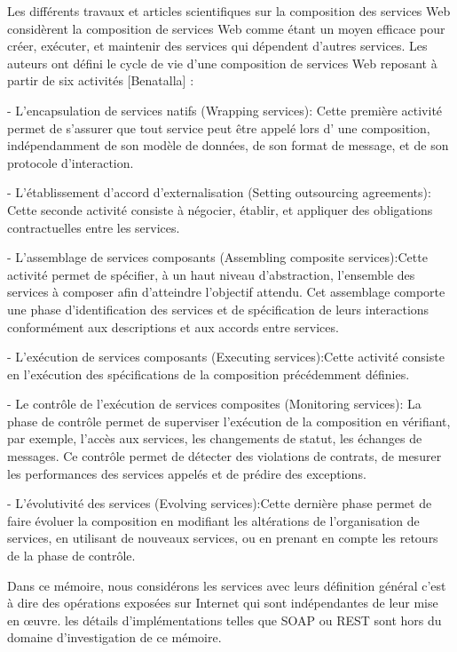 Les différents travaux et articles scientifiques sur la composition des services Web considèrent la composition de services Web comme étant un moyen efficace 
pour créer, exécuter, et maintenir des services qui dépendent d’autres services. Les auteurs ont défini le cycle de vie d’une composition de services Web reposant à partir de six activités [Benatalla] \cite{6}: 

- L’encapsulation de services natifs (Wrapping services): Cette première activité permet de  s’assurer que tout service peut être appelé lors d’ une composition, indépendamment de son  modèle de données, de son format de message, et de son protocole d’interaction. 


- L’établissement d’accord d’externalisation (Setting outsourcing agreements): Cette seconde activité consiste à négocier, établir, et appliquer des obligations contractuelles entre les services.


- L’assemblage de services composants (Assembling composite services):Cette activité permet  de spécifier, à un haut niveau d’abstraction, l’ensemble des services à composer afin d’atteindre  l’objectif attendu. Cet assemblage comporte une phase d’identification des services et de spécification de leurs interactions conformément aux descriptions et aux accords entre services. 


- L’exécution de services composants (Executing services):Cette activité consiste en l’exécution des spécifications de la composition précédemment définies. 


- Le contrôle de l’exécution de services composites (Monitoring services): La phase de contrôle permet de superviser l’exécution de la composition en vérifiant, par exemple, l’accès aux services, les changements de statut, les échanges de messages. Ce contrôle permet de détecter des violations de contrats, de mesurer les performances des services appelés et de prédire des exceptions. 


- L’évolutivité des services (Evolving services):Cette dernière phase permet de faire évoluer la composition en modifiant les altérations de l’organisation de services, en utilisant de nouveaux  services, ou en prenant en compte les retours de la phase de contrôle. \cite{6}



Dans ce mémoire, nous considérons les services avec leurs définition général c'est à dire des opérations exposées
sur Internet qui sont indépendantes de leur mise en œuvre. les détails d’implémentations telles que SOAP ou REST sont hors du domaine d’investigation de ce mémoire.

